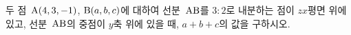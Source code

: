 두 점~$\mathrm{A}(4{,}\mkern3mu\mathopen{}3{,}\mkern3mu\mathopen{}-1)$, $\mathrm{B}(a{,}\mkern3mu\mathopen{}b{,}\mkern3mu\mathopen{}c)$에 대하여 선분~$\mathrm{AB}$를 $3:2$로 내분하는 점이 $zx$평면 위에 있고, 선분~$\mathrm{AB}$의 중점이 $y$축 위에 있을 때, $a+b+c$의 값을 구하시오.
